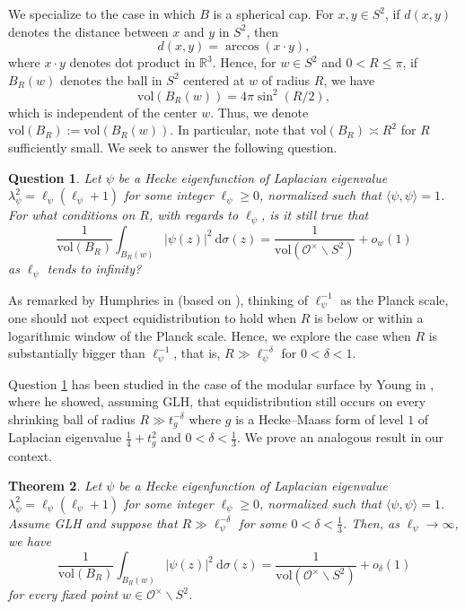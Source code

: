 \documentclass[11pt]{amsart}
\newtheorem{theorem}{Theorem}[section]
\newtheorem{question}[theorem]{Question}
\theoremstyle{definition}
\begin{document}
We specialize to the case in which $B$ is a spherical cap. For $x,y\in S^2$, if $d(x,y)$ denotes the distance between $x$ and $y$ in $S^2$, then $$d(x,y) = \arccos{(x\cdot y)},$$ where $x\cdot y$ denotes dot product in $\mathbb{R}^3$. Hence, for $w\in S^2$ and $0<R\leq \pi$, if $B_R(w)$ denotes the ball in $S^2$ centered at $w$ of radius $R$, we have $$ \mathrm{vol}(B_R(w)) = 4\pi \sin^2(R/2),$$ which is independent of the center $w$. Thus, we denote $\mathrm{vol}(B_R) := \mathrm{vol}(B_R(w))$. In particular, note that $\mathrm{vol}(B_R) \asymp R^2$ for $R$ sufficiently small. We seek to answer the following question.

\begin{question}\label{QUEQuestion}
Let $\psi$ be a Hecke eigenfunction of Laplacian eigenvalue $\lambda_{\psi}^2 = \ell_{\psi}(\ell_{\psi}+1)$ for some integer $\ell_{\psi}\geq 0$, normalized such that $\langle \psi, \psi\rangle = 1$. For what conditions on $R$, with regards to $\ell_{\psi}$, is it still true that 
\begin{equation}
    \frac{1}{\mathrm{vol}(B_R)} \int_{B_R(w)} |\psi(z)|^2 \: \mathrm{d}\sigma(z) = \frac{1}{\mathrm{vol}(\mathcal{O}^{\times}\backslash S^2)} + o_w(1) \label{QUESphericalCapQuestion}
\end{equation}
as $\ell_{\psi}$ tends to infinity? 
\end{question}

As remarked by Humphries in \cite[\S 1.3]{HumphriesPhD} (based on \cite[\S 5]{HejhalRackner}), thinking of $\ell_{\psi}^{-1}$ as the Planck scale, one should not expect equidistribution to hold when $R$ is below or within a logarithmic window of the Planck scale. Hence, we explore the case when $R$ is substantially bigger than $\ell_{\psi}^{-1}$, that is, $R\gg \ell_{\psi}^{-\delta}$ for $0<\delta <1$.

Question \ref{QUEQuestion} has been studied in the case of the modular surface by Young in \cite[Prop.~5]{YoungQUEShrinking}, where he showed, assuming GLH, that equidistribution still occurs on every shrinking ball of radius $R\gg t_{g}^{-\delta}$ where $g$ is a Hecke--Maass form of level $1$ of Laplacian eigenvalue $\frac{1}{4} + t_{g}^2$ and $0<\delta < \frac{1}{3}$. We prove an analogous result in our context.

\begin{theorem}\label{MainThm-AllCenters}
Let $\psi$ be a Hecke eigenfunction of Laplacian eigenvalue $\lambda_{\psi}^2 = \ell_{\psi}(\ell_{\psi}+1)$ for some integer $\ell_{\psi} \geq 0$, normalized such that $\langle \psi, \psi \rangle = 1$. Assume GLH and suppose that $R\gg \ell_{\psi}^{-\delta}$ for some $0<\delta < \frac{1}{3}$. Then, as $\ell_{\psi} \rightarrow \infty$, we have $$ \frac{1}{\mathrm{vol}(B_R)} \int_{B_R(w)} |\psi(z)|^2 \: \mathrm{d}\sigma(z) = \frac{1}{\mathrm{vol}(\mathcal{O}^{\times}\backslash S^2)} + o_{\delta}(1)$$ for every fixed point $w\in \mathcal{O}^{\times} \backslash S^2$.
\end{theorem}
\end{document}
